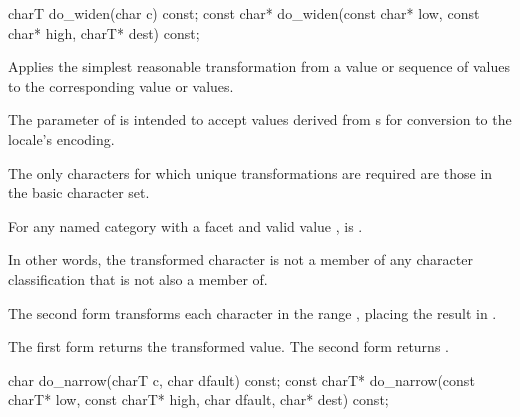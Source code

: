 %
\begin{itemdecl}
charT        do_widen(char c) const;
const char*  do_widen(const char* low, const char* high, charT* dest) const;
\end{itemdecl}

\begin{itemdescr}
\pnum
\effects
Applies the simplest reasonable transformation
from a  value or sequence of  values
to the corresponding  value or values.
\begin{footnote}
The parameter  of  is intended to
accept values derived from s
for conversion to the locale's encoding.
\end{footnote}
The only characters for which unique transformations are required
are those in the basic character set.

For any named  category with
a  facet  and
valid  value ,
 is .
\begin{footnote}
In other words, the transformed character is not
a member of any character classification
that  is not also a member of.
\end{footnote}

The second form transforms
each character  in the range ,
placing the result in .

\pnum
\returns
The first form returns the transformed value.
The second form returns .
\end{itemdescr}

%
\begin{itemdecl}
char         do_narrow(charT c, char dfault) const;
const charT* do_narrow(const charT* low, const charT* high, char dfault, char* dest) const;
\end{itemdecl}

